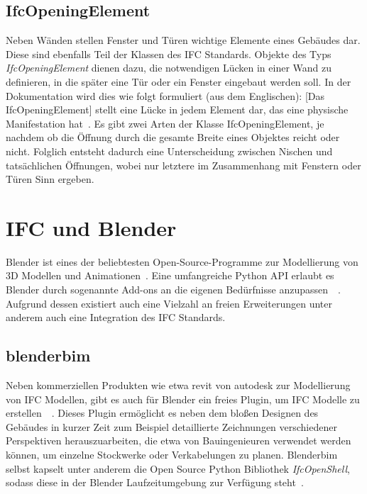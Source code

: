 \subsection{IfcOpeningElement}\label{basics:IfcOpeningElement}
Neben Wänden stellen Fenster und Türen wichtige Elemente eines Gebäudes dar.
Diese sind ebenfalls Teil der Klassen des IFC Standards.
Objekte des Typs \textit{IfcOpeningElement} dienen dazu, die notwendigen Lücken in einer Wand zu definieren, in die später eine Tür oder ein Fenster eingebaut werden soll.
In der Dokumentation wird dies wie folgt formuliert (aus dem Englischen): \glqq{}[Das IfcOpeningElement] stellt eine Lücke in jedem Element dar, das eine physische Manifestation hat\grqq{}~\cite{IFC4310OpeningElement:online}.
Es gibt zwei Arten der Klasse IfcOpeningElement, je nachdem ob die Öffnung durch die gesamte Breite eines Objektes reicht oder nicht. 
Folglich entsteht dadurch eine Unterscheidung zwischen Nischen und tatsächlichen Öffnungen, wobei nur letztere im Zusammenhang mit Fenstern oder Türen Sinn ergeben.

\section{IFC und Blender}\label{basics:blender}
Blender ist eines der beliebtesten Open-Source-Programme zur Modellierung von 3D Modellen und Animationen~\cite{blendero56:online}.
Eine umfangreiche Python API erlaubt es Blender durch sogenannte Add-ons an die eigenen Bedürfnisse anzupassen~\cite{PythonWebsite:online}~\cite{BlenderPythonAPI:online}.
Aufgrund dessen existiert auch eine Vielzahl an freien Erweiterungen \textendash{} unter anderem auch eine Integration des IFC Standards.

\subsection{blenderbim}\label{basics:blenderbim}
Neben kommerziellen Produkten wie etwa revit von autodesk zur Modellierung von IFC Modellen, gibt es auch für Blender ein freies Plugin, um IFC Modelle zu erstellen~\cite{RevitSof26:online}~\cite{BlenderB43:online}.
Dieses Plugin ermöglicht es neben dem bloßen Designen des Gebäudes in kurzer Zeit zum Beispiel detaillierte Zeichnungen verschiedener Perspektiven herauszuarbeiten, die etwa von Bauingenieuren verwendet werden können, um einzelne Stockwerke oder Verkabelungen zu planen.
Blenderbim selbst kapselt unter anderem die Open Source Python Bibliothek \textit{IfcOpenShell}, sodass diese in der Blender Laufzeitumgebung zur Verfügung steht~\cite{IFCOpenShell:online}.

